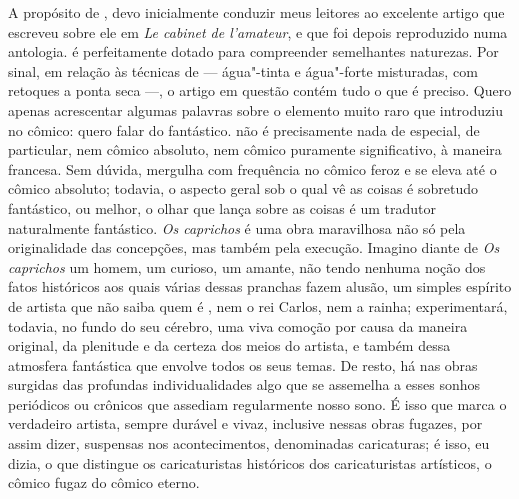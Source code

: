 A propósito de , devo inicialmente conduzir meus leitores ao
excelente artigo que  escreveu sobre ele em \textit{Le
cabinet de l’amateur}, e que foi depois reproduzido numa antologia.
 é perfeitamente dotado para compreender semelhantes
naturezas. Por sinal, em relação às técnicas de  --- água"-tinta e
água"-forte misturadas, com retoques a ponta seca ---, o artigo em questão
contém tudo o que é preciso. Quero apenas acrescentar algumas palavras
sobre o elemento muito raro que  introduziu no cômico: quero falar
do fantástico.  não é precisamente nada de especial, de particular,
nem cômico absoluto, nem cômico puramente significativo, à maneira
francesa. Sem dúvida, mergulha com frequência no cômico feroz e se
eleva até o cômico absoluto; todavia, o aspecto geral sob o qual vê as
coisas é sobretudo fantástico, ou melhor, o olhar que lança sobre as
coisas é um tradutor naturalmente fantástico. \textit{Os caprichos} é
uma obra maravilhosa não só pela originalidade das concepções, mas
também pela execução. Imagino diante de \textit{Os caprichos} um homem,
um curioso, um amante, não tendo nenhuma noção dos fatos históricos aos
quais várias dessas pranchas fazem alusão, um simples espírito de
artista que não saiba quem é , nem o rei Carlos, nem a rainha;
experimentará, todavia, no fundo do seu cérebro, uma viva comoção por
causa da maneira original, da plenitude e da certeza dos meios do
artista, e também dessa atmosfera fantástica que envolve todos os seus
temas. De resto, há nas obras surgidas das profundas individualidades
algo que se assemelha a esses sonhos periódicos ou crônicos que
assediam regularmente nosso sono. É isso que marca o verdadeiro
artista, sempre durável e vivaz, inclusive nessas obras fugazes, por
assim dizer, suspensas nos acontecimentos, denominadas caricaturas; é
isso, eu dizia, o que distingue os caricaturistas históricos dos
caricaturistas artísticos, o cômico fugaz do cômico eterno.

